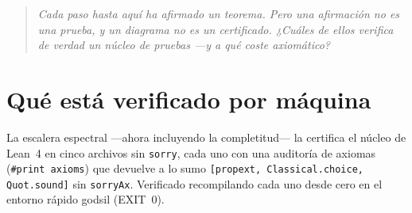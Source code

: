 \documentclass[11pt]{article}
\newcommand{\lean}[1]{\texttt{#1}}
\newcommand{\qlink}[1]{\par\medskip\begin{quote}\itshape\small\color{ctB!88!black}#1\end{quote}\medskip}
\begin{document}
\qlink{Cada paso hasta aqu\'i ha \emph{afirmado} un teorema. Pero una afirmaci\'on no es una prueba, y un
diagrama no es un certificado. ¿Cu\'ales de ellos verifica de verdad un n\'ucleo de pruebas ---y a qu\'e
coste axiom\'atico?}

\section{Qu\'e est\'a verificado por m\'aquina}\label{sec:checked}

La escalera espectral ---ahora incluyendo la completitud--- la certifica el n\'ucleo de Lean~4 en cinco
archivos sin \lean{sorry}, cada uno con una auditor\'ia de axiomas (\lean{\#print axioms}) que devuelve a lo
sumo \lean{[propext, Classical.choice, Quot.sound]} sin \lean{sorryAx}. Verificado recompilando cada uno
desde cero en el entorno r\'apido godsil (EXIT~0).
\end{document}
